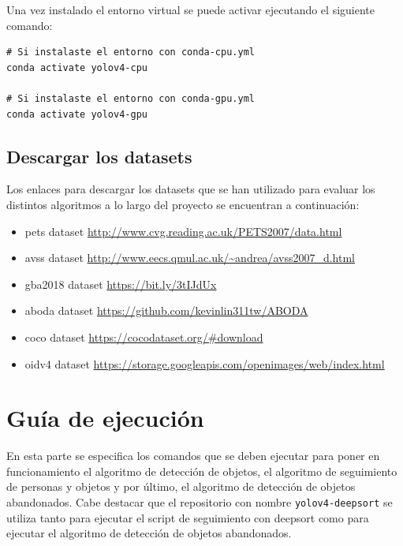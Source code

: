 Una vez instalado el entorno virtual se puede activar ejecutando el siguiente comando:

\vspace{0.5cm}

\begin{lstlisting}[language=iPython,caption=Activar entorno virtual de Anaconda,captionpos=b,label={lst:activar-env}]
# Si instalaste el entorno con conda-cpu.yml
conda activate yolov4-cpu

# Si instalaste el entorno con conda-gpu.yml
conda activate yolov4-gpu
\end{lstlisting}

\subsection{Descargar los datasets}
\label{subsec:descarga-datasets}

Los enlaces para descargar los datasets que se han utilizado para evaluar los distintos algoritmos a lo largo del proyecto se encuentran a continuación:

\begin{itemize}
    \item \gls{pets} dataset \url{http://www.cvg.reading.ac.uk/PETS2007/data.html} \cite{pets2007-dataset}
    \item \gls{avss} dataset \url{http://www.eecs.qmul.ac.uk/~andrea/avss2007_d.html} \cite{AVSSAB2007-dataset}
    \item \gls{gba2018} dataset \url{https://bit.ly/3tIJdUx} \cite{gba-dataset}
    \item \gls{aboda} dataset \url{https://github.com/kevinlin311tw/ABODA} \cite{aboda-dataset}
    \item \gls{coco} dataset \url{https://cocodataset.org/#download} \cite{lin2015microsoft}
    \item \gls{oidv4} dataset \url{https://storage.googleapis.com/openimages/web/index.html} \cite{Kuznetsova_2020}
    
\end{itemize}

\section{Guía de ejecución}
\label{sec:guia-ejecucion}

En esta parte se especifica los comandos que se deben ejecutar para poner en funcionamiento el algoritmo de detección de objetos, el algoritmo de seguimiento de personas y objetos y por último, el algoritmo de detección de objetos abandonados. Cabe destacar que el repositorio con nombre \texttt{yolov4-deepsort} se utiliza tanto para ejecutar el script de seguimiento con \gls{deepsort} como para ejecutar el algoritmo de detección de objetos abandonados.

